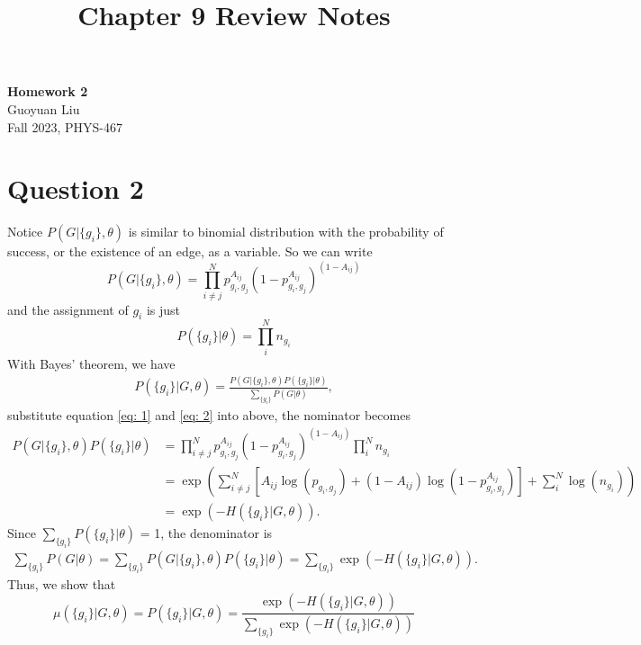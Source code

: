 \documentclass[11pt]{article}
\theoremstyle{definition}
\begin{document}
\title{Chapter 9 Review Notes}
\thispagestyle{empty}
\begin{center}
{\LARGE \bf Homework 2}\\
{\large Guoyuan Liu}\\
Fall 2023, PHYS-467
\end{center}

\section*{Question 2}
Notice $P(G|\{g_i\}, \theta)$ is similar to binomial distribution with the probability of success, or the existence of an edge, as a variable. So we can write
\begin{equation}
    \label{eq: 1}
    P(G|\{g_i\}, \theta) = \prod_{i\neq j}^N p_{g_i,g_j}^{A_{ij}} (1 - p_{g_i , g_j}^{A_{ij}})^{(1-A_{ij})}
\end{equation}
and the assignment of $g_i$ is just
\begin{equation}
    \label{eq: 2}
    P(\{g_i\}|\theta) = \prod_i^N n_{g_i}
\end{equation}
With Bayes' theorem, we have
\begin{align*}
        P(\{g_i\}| G, \theta) = \frac{P(G|\{g_i\}, \theta) P(\{g_i\}|\theta)}{\sum_{\{g_i\}} P(G|\theta)},
\end{align*}
substitute equation \ref{eq: 1} and \ref{eq: 2} into above, the nominator becomes
\begin{align*}
    P(G|\{g_i\}, \theta) P(\{g_i\}|\theta) &= \prod_{i\neq j}^N p_{g_i,g_j}^{A_{ij}} (1 - p_{g_i , g_j}^{A_{ij}})^{(1-A_{ij})} \prod_i^N n_{g_i}\\
    &= \exp(\sum_{i\neq j}^N [A_{ij}\log (p_{g_i,g_j})+(1-A_{ij}) \log (1 - p_{g_i , g_j}^{A_{ij}})] + \sum_i^N \log(n_{g_i})) \\
    &= \exp(- H(\{g_i\}| G, \theta)).
\end{align*}
Since $\sum_{\{g_i\}} P(\{g_i\}|\theta)$ = 1, the denominator is
\begin{align*}
    \sum_{\{g_i\}} P(G|\theta) = \sum_{\{g_i\}} P(G|\{g_i\},\theta) P(\{g_i\}|\theta) = \sum_{\{g_i\}}\exp(- H(\{g_i\}| G, \theta)).
\end{align*}
Thus, we show that
\begin{equation*}
    \mu(\{g_i\}| G, \theta) = P(\{g_i\}| G, \theta) = \frac{\exp(- H(\{g_i\}| G, \theta))}{\sum_{\{g_i\}}\exp(- H(\{g_i\}| G, \theta))}
\end{equation*}
\end{document}
